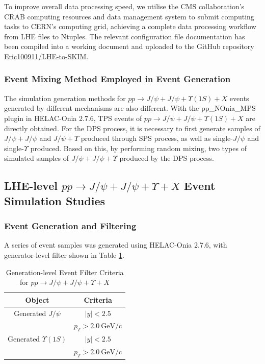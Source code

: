 \documentclass[10pt,twocolumn]{article}
\newcommand*{\GeVc}{~\text{GeV/c}}
\begin{document}
To improve overall data processing speed, we utilise the CMS collaboration's CRAB computing resources and data management system to submit computing tasks to CERN's computing grid, achieving a complete data processing workflow from LHE files to Ntuples. The relevant configuration file documentation has been compiled into a working document and uploaded to the GitHub repository \href{https://github.com/Eric100911/LHE-to-SKIM}{Eric100911/LHE-to-SKIM}.

\subsubsection{Event Mixing Method Employed in Event Generation}

The simulation generation methods for $pp\to J/\psi+J/\psi+\Upsilon(1S)+X$ events generated by different mechanisms are also different. With the pp\_NOnia\_MPS plugin in HELAC-Onia 2.7.6, TPS events of $pp\to J/\psi+J/\psi+\Upsilon(1S)+X$ are directly obtained. For the DPS process, it is necessary to first generate samples of $J/\psi+J/\psi$ and $J/\psi+\Upsilon$ produced through SPS process, as well as single-$J/\psi$ and single-$\Upsilon$ produced. Based on this, by performing random mixing, two types of simulated samples of $J/\psi+J/\psi+\Upsilon$ produced by the DPS process.

\subsection{LHE-level $pp\to J/\psi+J/\psi+\Upsilon+X$ Event Simulation Studies}

\subsubsection{Event Generation and Filtering}

A series of event samples was generated using HELAC-Onia 2.7.6, with generator-level filter shown in Table \ref{tab:JpsiJpsiY_MC_GEN_Filter}. 

\begin{table}[]
    \centering
    \caption{Generation-level Event Filter Criteria for $pp\to J/\psi+J/\psi+\Upsilon+X$\\}
    \label{tab:JpsiJpsiY_MC_GEN_Filter}
    \begin{tabular}{cc}
        \toprule
        \textbf{Object} & \textbf{Criteria} \\
        \midrule
        Generated $J/\psi $     &   $\left|y\right|<2.5$ \\
                                &   $p_T > 2.0\GeVc$ \\
        Generated $\Upsilon(1S)$&   $\left|y\right|<2.5$ \\
                                &   $p_T > 2.0\GeVc$ \\
        \bottomrule
    \end{tabular}
\end{table}
\end{document}
